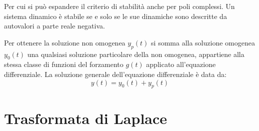 \documentclass{article}
\numberwithin{equation}{subsection}
\begin{document}
Per cui si può espandere il criterio di stabilità anche per poli complessi. Un sistema dinamico è stabile se e solo se le sue dinamiche sono descritte da autovalori 
a parte reale negativa. 

Per ottenere la soluzione non omogenea $y_p(t)$ si somma alla soluzione omogenea $y_0(t)$ una qualsiasi soluzione particolare della non omogenea, appartiene alla stessa classe 
di funzioni del forzamento $g(t)$ applicato all'equazione differenziale. La soluzione generale dell'equazione differenziale è data da:
\begin{equation*}
    y(t)=y_0(t)+y_p(t)
\end{equation*}

\clearpage

\section{Trasformata di Laplace}
\end{document}
